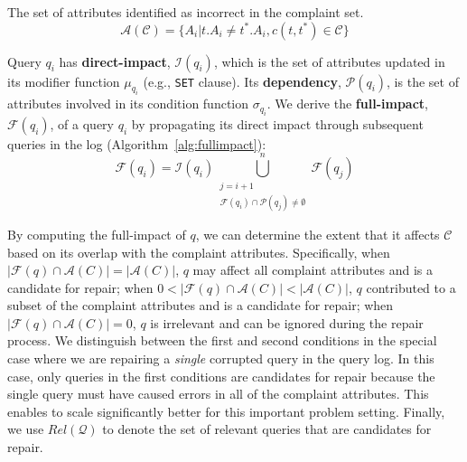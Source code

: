 \begin{definition} 
	The set of attributes identified as incorrect in the complaint set.
	\[\mathcal{A}(\mathcal{C}) = \{A_i | t.A_i \neq t^*.A_i, c(t,t^*) \in \mathcal{C}\}\]
\end{definition} 


\begin{definition}
    Query $q_i$ has \textbf{direct-impact}, $\mathcal{I}(q_i)$, which is
    the set of attributes updated in its modifier function $\mu_{q_i}$
    (e.g., \texttt{SET} clause). Its \textbf{dependency},
    $\mathcal{P}(q_i)$, is the set of attributes involved in its
    condition function $\sigma_{q_i}$.
    We derive the \textbf{full-impact}, $\mathcal{F}(q_i)$, of a query $q_i$ by propagating its direct impact through subsequent queries in the log (Algorithm~\ref{alg:fullimpact}):
    \[
    \mathcal{F}(q_i)=\mathcal{I}(q_i)\bigcup_{\substack{j=i+1\\ \mathcal{F}(q_i)\cap \mathcal{P}(q_j) \neq \emptyset}}^n \mathcal{F}(q_j)
    \]
\end{definition}






By computing the full-impact of $q$, we can determine the extent that it affects $\mathcal{C}$
based on its overlap with the complaint attributes.
Specifically, 
when $|\mathcal{F}(q) \cap \mathcal{A}(C)|=|\mathcal{A}(C)|$, $q$ may affect all complaint attributes and is a candidate for repair; 
when $0 < |\mathcal{F}(q) \cap \mathcal{A}(C)| < |\mathcal{A}(C)|$, 
$q$ contributed to a subset of the complaint attributes and is a candidate for repair;
when $|\mathcal{F}(q) \cap \mathcal{A}(C)|=0$, $q$ is irrelevant 
and can be ignored during the repair process.
We distinguish between the first and second conditions in the special case where we are repairing a \emph{single} 
corrupted query in the query log.  In this case, only queries in the first conditions are candidates for repair because 
the single query must have caused errors in all of the complaint attributes.  This enables \sys to scale significantly better
for this important problem setting. 
Finally, we use $Rel\mathcal{(Q)}$ to denote the set of relevant
queries that are candidates for repair.


